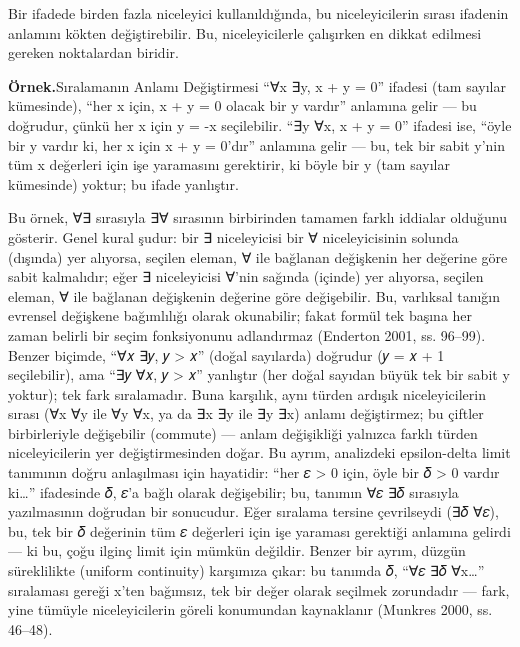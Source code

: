 Bir ifadede birden fazla niceleyici kullanıldığında, bu niceleyicilerin sırası ifadenin anlamını kökten değiştirebilir. Bu, niceleyicilerle çalışırken en dikkat edilmesi gereken noktalardan biridir.

\begin{tcolorbox}[bookbox,colback=cEx]\textbf{\textsf{\textcolor{cAcc}{Örnek.}}}\quad Sıralamanın Anlamı Değiştirmesi “∀x ∃y, x + y = 0” ifadesi (tam sayılar kümesinde), “her x için, x + y = 0 olacak bir y vardır” anlamına gelir — bu doğrudur, çünkü her x için y = -x seçilebilir. “∃y ∀x, x + y = 0” ifadesi ise, “öyle bir y vardır ki, her x için x + y = 0’dır” anlamına gelir — bu, tek bir sabit y’nin tüm x değerleri için işe yaramasını gerektirir, ki böyle bir y (tam sayılar kümesinde) yoktur; bu ifade yanlıştır.\end{tcolorbox}

Bu örnek, ∀∃ sırasıyla ∃∀ sırasının birbirinden tamamen farklı iddialar olduğunu gösterir. Genel kural şudur: bir ∃ niceleyicisi bir ∀ niceleyicisinin solunda (dışında) yer alıyorsa, seçilen eleman, ∀ ile bağlanan değişkenin her değerine göre sabit kalmalıdır; eğer ∃ niceleyicisi ∀’nin sağında (içinde) yer alıyorsa, seçilen eleman, ∀ ile bağlanan değişkenin değerine göre değişebilir. Bu, varlıksal tanığın evrensel değişkene bağımlılığı olarak okunabilir; fakat formül tek başına her zaman belirli bir seçim fonksiyonunu adlandırmaz (Enderton 2001, ss. 96–99). Benzer biçimde, “∀𝑥 ∃𝑦, 𝑦 > 𝑥” (doğal sayılarda) doğrudur (𝑦 = 𝑥 + 1 seçilebilir), ama “∃𝑦 ∀𝑥, 𝑦 > 𝑥” yanlıştır (her doğal sayıdan büyük tek bir sabit y yoktur); tek fark sıralamadır. Buna karşılık, aynı türden ardışık niceleyicilerin sırası (∀x ∀y ile ∀y ∀x, ya da ∃x ∃y ile ∃y ∃x) anlamı değiştirmez; bu çiftler birbirleriyle değişebilir (commute) — anlam değişikliği yalnızca farklı türden niceleyicilerin yer değiştirmesinden doğar. Bu ayrım, analizdeki epsilon-delta limit tanımının doğru anlaşılması için hayatidir: “her 𝜀 > 0 için, öyle bir 𝛿 > 0 vardır ki…” ifadesinde 𝛿, 𝜀’a bağlı olarak değişebilir; bu, tanımın ∀𝜀 ∃𝛿 sırasıyla yazılmasının doğrudan bir sonucudur. Eğer sıralama tersine çevrilseydi (∃𝛿 ∀𝜀), bu, tek bir 𝛿 değerinin tüm 𝜀 değerleri için işe yaraması gerektiği anlamına gelirdi — ki bu, çoğu ilginç limit için mümkün değildir. Benzer bir ayrım, düzgün süreklilikte (uniform continuity) karşımıza çıkar: bu tanımda 𝛿, “∀𝜀 ∃𝛿 ∀x…” sıralaması gereği x’ten bağımsız, tek bir değer olarak seçilmek zorundadır — fark, yine tümüyle niceleyicilerin göreli konumundan kaynaklanır (Munkres 2000, ss. 46–48).

